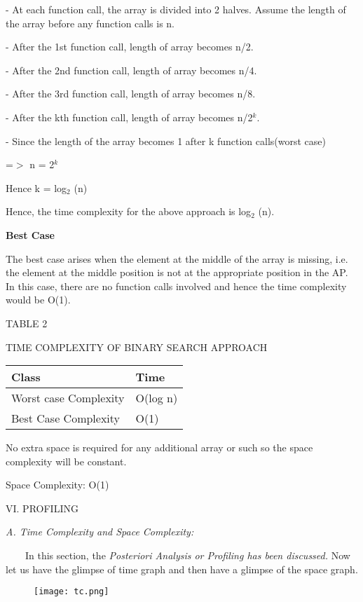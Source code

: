 \documentclass[12pt,a4paper]{article}
\begin{document}
\begin{multicols}{2}
- At each function call, the array is divided into 2 halves. Assume the length of the array before any function calls is n.

- After the 1st function call, length of array becomes n/2.

-  After the 2nd function call, length of array becomes n/4.

-  After the 3rd function call, length of array becomes n/8.

-  After the kth function call, length of array becomes n/2$^{k}$.

-  Since the length of the array becomes 1 after k function calls(worst case) 

=$>$ n = 2$^{k}$

Hence k = log$_{2}$ (n)



Hence, the time complexity for the above approach is log$_{2}$
(n).

\textbf{Best Case }

The best case arises when the element at the middle of the array is missing, i.e. the element at the middle position is not at the appropriate position in the AP. In this case, there are no function calls involved and hence the time complexity would be O(1).


\end{multicols}
\begin{center}TABLE 2\end{center}

\begin{center}TIME COMPLEXITY OF BINARY SEARCH APPROACH\end{center}

\begin{table}[h]
\centering
\begin{tabular}{|l|l|}
\hline
\textbf{Class} & \textbf{Time} \\
\hline
Worst case Complexity & O(log n) \\
\hline
Best Case Complexity & O(1) \\
\hline
\end{tabular}
\end{table}

\begin{multicols}{2}
No extra space is required for any additional array or such so the space 
complexity will be constant.

Space Complexity: O(1)



\begin{center}VI. PROFILING\end{center}



\textit{A. Time Complexity and Space Complexity:}

\ \ \ \ In this section, the  \textit{Posteriori Analysis or Profiling has been discussed. }
Now let us have the glimpse of time graph and then have a glimpse of the space graph.
\end{multicols}
\begin{figure}[h]
\centering
\texttt{[image: tc.png]}
\end{figure}
\end{document}
